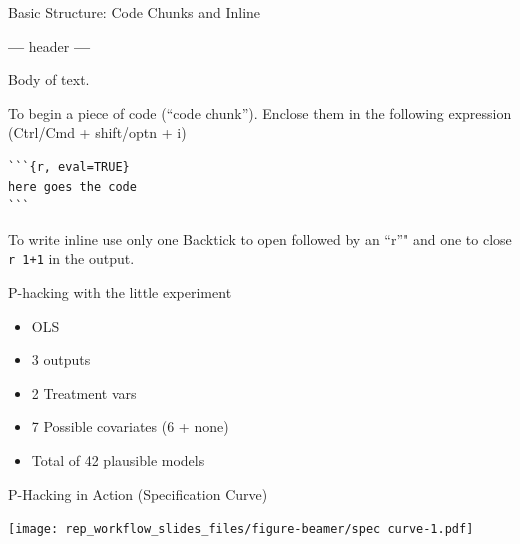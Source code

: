 \documentclass[ignorenonframetext,]{beamer}
\newenvironment{Shaded}{\begin{snugshade}}{\end{snugshade}}
\newcommand{\NormalTok}[1]{#1}
\newcommand{\OperatorTok}[1]{\textcolor[rgb]{0.81,0.36,0.00}{\textbf{#1}}}
\providecommand{\tightlist}{%
  \setlength{\itemsep}{0pt}\setlength{\parskip}{0pt}}
\begin{document}
\begin{frame}[fragile]{Basic Structure: Code Chunks and Inline}
\protect\hypertarget{basic-structure-code-chunks-and-inline}{}

\begin{Shaded}
\begin{Highlighting}[]
\OperatorTok{---}
\NormalTok{header}
\OperatorTok{---}
\end{Highlighting}
\end{Shaded}

Body of text.

To begin a piece of code (``code chunk''). Enclose them in the following
expression (Ctrl/Cmd + shift/optn + i)

\begin{verbatim}
```{r, eval=TRUE}
here goes the code
```
\end{verbatim}

To write inline use only one Backtick to open followed by an ``r''" and
one to close \texttt{\textasciigrave{}r\ 1+1\textasciigrave{}} in the
output.

\end{frame}

\begin{frame}{P-hacking with the little experiment}
\protect\hypertarget{p-hacking-with-the-little-experiment}{}

\begin{itemize}
\tightlist
\item
  OLS
\item
  3 outputs
\item
  2 Treatment vars\\
\item
  7 Possible covariates (6 + none)\\
\item
  Total of 42 plausible models
\end{itemize}

\end{frame}

\begin{frame}{P-Hacking in Action (Specification Curve)}
\protect\hypertarget{p-hacking-in-action-specification-curve}{}

\texttt{[image: rep\_workflow\_slides\_files/figure-beamer/spec curve-1.pdf]}

\end{frame}
\end{document}
